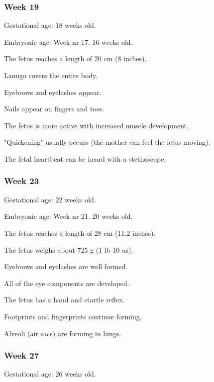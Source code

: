 \documentclass[12pt,a4paper,onecolumn]{article}
\begin{document}
\subsubsection{Week 19}

Gestational age: 18 weeks old.

Embryonic age: Week nr 17. 16 weeks old.

\begin{wuxch_item}
    \item The fetus reaches a length of 20 cm (8 inches).
    \item Lanugo covers the entire body.
    \item Eyebrows and eyelashes appear.
    \item Nails appear on fingers and toes.
    \item The fetus is more active with increased muscle development.
    \item "Quickening" usually occurs (the mother can feel the fetus moving).
    \item The fetal heartbeat can be heard with a stethoscope.
\end{wuxch_item}

\subsubsection{Week 23}

Gestational age: 22 weeks old.

Embryonic age: Week nr 21. 20 weeks old.
\begin{wuxch_item}
    \item The fetus reaches a length of 28 cm (11.2 inches).
    \item The fetus weighs about 725 g (1 lb 10 oz).
    \item Eyebrows and eyelashes are well formed.
    \item All of the eye components are developed.
    \item The fetus has a hand and startle reflex.
    \item Footprints and fingerprints continue forming.
    \item Alveoli (air sacs) are forming in lungs.
\end{wuxch_item}
\subsubsection{Week 27}

Gestational age: 26 weeks old.
\end{document}
